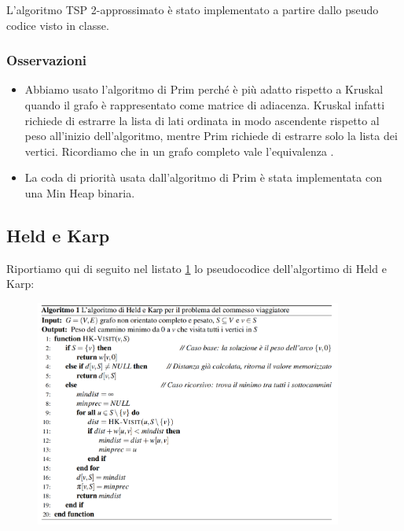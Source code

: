 \noindent L'algoritmo TSP 2-approssimato è stato implementato a partire dallo pseudo codice visto in classe. \\

\subsubsection{Osservazioni}

\begin{itemize}
    \item Abbiamo usato l'algoritmo di Prim perché è più adatto rispetto a Kruskal quando il grafo è rappresentato come matrice di adiacenza. Kruskal infatti richiede di estrarre la lista di lati ordinata in modo ascendente rispetto al peso all'inizio dell'algoritmo, mentre Prim richiede di estrarre solo la lista dei vertici. Ricordiamo che in un grafo completo vale l'equivalenza \complexityCompleteGraph{}.
    
    \item La coda di priorità usata dall'algoritmo di Prim è stata implementata con una Min Heap binaria.
\end{itemize}

\subsection{Held e Karp}

Riportiamo qui di seguito nel listato \ref{fig:heldkarp-pseudocode} lo pseudocodice dell'algortimo di Held e Karp:

\begin{figure}[h]
	\centering
	\includegraphics[width=0.9\textwidth]{./images/HeldKarpPseudocode.png}
	\label{fig:heldkarp-pseudocode}
\end{figure}

